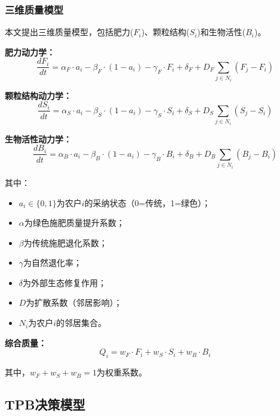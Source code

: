 \documentclass[12pt,a4paper]{article}
\numberwithin{equation}{section}
\begin{document}
\subsubsection{三维质量模型}

本文提出三维质量模型，包括肥力($F_i$)、颗粒结构($S_i$)和生物活性($B_i$)。

\textbf{肥力动力学：}
\begin{equation}
\frac{dF_i}{dt} = \alpha_F \cdot a_i - \beta_F \cdot (1-a_i) - \gamma_F \cdot F_i + \delta_F + D_F \sum_{j \in N_i} (F_j - F_i)
\label{eq:fertility_dynamics}
\end{equation}

\textbf{颗粒结构动力学：}
\begin{equation}
\frac{dS_i}{dt} = \alpha_S \cdot a_i - \beta_S \cdot (1-a_i) - \gamma_S \cdot S_i + \delta_S + D_S \sum_{j \in N_i} (S_j - S_i)
\label{eq:structure_dynamics}
\end{equation}

\textbf{生物活性动力学：}
\begin{equation}
\frac{dB_i}{dt} = \alpha_B \cdot a_i - \beta_B \cdot (1-a_i) - \gamma_B \cdot B_i + \delta_B + D_B \sum_{j \in N_i} (B_j - B_i)
\label{eq:biological_dynamics}
\end{equation}

其中：
\begin{itemize}
    \item $a_i \in \{0,1\}$为农户$i$的采纳状态（0=传统，1=绿色）；
    \item $\alpha$为绿色施肥质量提升系数；
    \item $\beta$为传统施肥退化系数；
    \item $\gamma$为自然退化率；
    \item $\delta$为外部生态修复作用；
    \item $D$为扩散系数（邻居影响）；
    \item $N_i$为农户$i$的邻居集合。
\end{itemize}

\textbf{综合质量：}
\begin{equation}
Q_i = w_F \cdot F_i + w_S \cdot S_i + w_B \cdot B_i
\label{eq:comprehensive_quality}
\end{equation}

其中，$w_F + w_S + w_B = 1$为权重系数。

\subsection{TPB决策模型}
\end{document}
